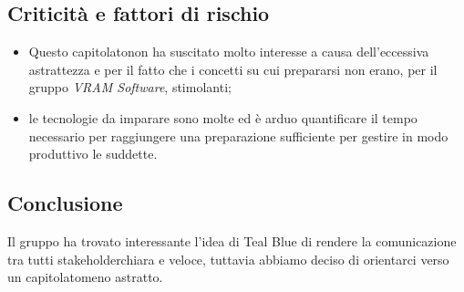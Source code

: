 \subsection{Criticità e fattori di rischio}
\begin{itemize}
	\item Questo capitolato\glosp non ha suscitato molto interesse a causa dell'eccessiva astrattezza e per il fatto che i concetti su cui prepararsi non erano, per il gruppo \textit{VRAM Software}, stimolanti;
	\item le tecnologie da imparare sono molte ed è arduo quantificare il tempo necessario per raggiungere una preparazione sufficiente per gestire in modo produttivo le suddette.
\end{itemize}
\subsection{Conclusione}
Il gruppo ha trovato interessante l'idea di Teal Blue di rendere la comunicazione tra tutti stakeholder\glosp chiara e veloce, tuttavia abbiamo deciso di orientarci verso un capitolato\glosp meno astratto.
